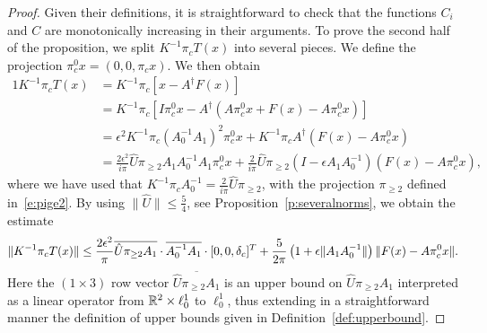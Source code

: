 
\begin{proof}
	Given their definitions, it is straightforward to check that the functions $C_i$ and $C$ are monotonically increasing in their arguments.  
	To prove the second half of the proposition, we split 
	$K^{-1} \pi_c  T(x)$ into several pieces. 
	We define the projection $\pi_c^0 x = (0,0,\pi_c x)$.
We then obtain
	\begin{alignat*}{1}
	K^{-1} \pi_c  T(x)  &= K^{-1} \pi_c   [ x - A^{\dagger} F(x) ]   \\
	&= K^{-1} \pi_c  [ I \pi_c^0 x -    A^{\dagger} ( A \pi_c^0 x + F(x) - A \pi_c^0 x)]  \\
	&= \epsilon^2 K^{-1} \pi_c (A_0^{-1}A_{1})^2 \pi_c^0 x + K^{-1} \pi_c A^{\dagger} (F(x) - A \pi_c^0 x) \nonumber \\
	&=  \frac{2 \epsilon^2}{i\pi} \hat{U} \pi_{\ge 2} A_1 A_0^{-1}A_{1} \pi_c^0 x +\frac{2 }{i\pi} \hat{U}  \pi_{\ge 2} (I-\epsilon A_1 A_0^{-1}) (F(x) - A\pi_c^0 x)  ,
\end{alignat*}
where we have used that $K^{-1} \pi_c A_0^{-1} = \frac{2}{i\pi} \hat{U} \pi_{\ge 2}$, with the projection $\pi_{\ge 2}$ defined in~\eqref{e:pige2}.
By using $\| \hat{U} \| \leq \frac{5}{4}$, see Proposition~\ref{p:severalnorms}, we obtain the estimate
\begin{equation}
	\| K^{-1} \pi_c T(x) \| \leq   \frac{2 \epsilon^2}{\pi} \overline{\hat{U}\pi_{\ge 2} A_1} \cdot  \overline{ A_0^{-1}A_{1}}  \cdot
	[0,0,\delta_c ]^T +\frac{5 }{2 \pi} \left(1 + \epsilon \| A_1 A_0^{-1} \| \right) \|F(x) - A\pi_c^0 x \| .
	\label{eq:DerivativeEndo}
\end{equation}
Here the $(1 \times 3)$ row vector $\overline{\hat{U}\pi_{\ge 2} A_1}$ is an upper bound on $\hat{U}\pi_{\ge 2} A_1$ interpreted as a linear operator from $\mathbb{R}^2 \times \ell^1_0$ to $\ell^1_0$, thus extending in a straightforward manner the definition of upper bounds given in  Definition~\ref{def:upperbound}.
	

\end{proof}
